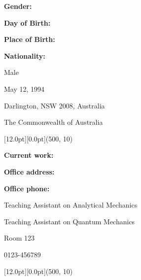 \documentclass[12pt,a4paper]{report}
\newcommand{\myworkA}{Teaching Assistant on Analytical Mechanics}
\newcommand{\myworkB}{Teaching Assistant on Quantum Mechanics}
\begin{document}
    \begin{center}
        \begin{minipage}[t]{125pt}
            \qquad \textbf{Gender:}\par
            \qquad \textbf{Day of Birth:}\par
            \qquad \textbf{Place of Birth:}\par
            \qquad \textbf{Nationality:}\par
        \end{minipage}
        \begin{minipage}[t]{375pt}
            Male \par
            May 12, 1994 \par
            Darlington, NSW 2008, Australia \par
            The Commonwealth of Australia \par
        \end{minipage}
    \end{center}
    \begin{center}\begin{minipage}[t]{512pt}
        \colorbox{subtitlecolor}{\raisebox{0pt}[12.0pt][0.0pt]{\makebox(500, 10){
            \textcolor{white}{\ttfamily{}\selectfont{}}}}}\end{minipage}\end{center}
    \begin{center}
        \begin{minipage}[t]{125pt}
            \qquad \textbf{Current work:}\par
            \qquad \par
            \qquad \textbf{Office address:}\par
            \qquad \textbf{Office phone:}\par
        \end{minipage}
        \begin{minipage}[t]{375pt}
            {\myworkA} \par
            {\myworkB} \par
            Room 123 \par
            0123-456789 \par
        \end{minipage}
    \end{center}
    \begin{center}\begin{minipage}[t]{512pt}
        \colorbox{subtitlecolor}{\raisebox{0pt}[12.0pt][0.0pt]{\makebox(500, 10){
            \textcolor{white}{\ttfamily{}\selectfont{}}}}}\end{minipage}\end{center}
\end{document}
